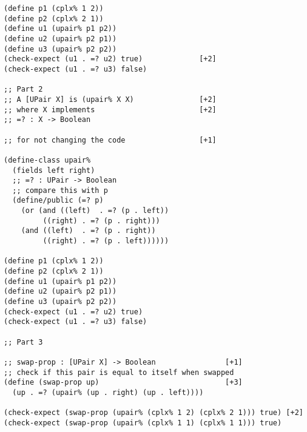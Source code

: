 \documentclass[12pt]{article}                   %
\newenvironment{solution}{}{}
\begin{document}
\begin{problem}
\begin{solution}
\begin{verbatim}
(define p1 (cplx% 1 2))
(define p2 (cplx% 2 1))
(define u1 (upair% p1 p2))
(define u2 (upair% p2 p1))
(define u3 (upair% p2 p2))
(check-expect (u1 . =? u2) true)             [+2]
(check-expect (u1 . =? u3) false)

;; Part 2
;; A [UPair X] is (upair% X X)               [+2]
;; where X implements                        [+2]
;; =? : X -> Boolean

;; for not changing the code                 [+1]

(define-class upair%
  (fields left right)
  ;; =? : UPair -> Boolean
  ;; compare this with p
  (define/public (=? p)
    (or (and ((left)  . =? (p . left))
	     ((right) . =? (p . right)))
	(and ((left)  . =? (p . right))
	     ((right) . =? (p . left))))))

(define p1 (cplx% 1 2))
(define p2 (cplx% 2 1))
(define u1 (upair% p1 p2))
(define u2 (upair% p2 p1))
(define u3 (upair% p2 p2))
(check-expect (u1 . =? u2) true)
(check-expect (u1 . =? u3) false)

;; Part 3

;; swap-prop : [UPair X] -> Boolean                [+1]
;; check if this pair is equal to itself when swapped
(define (swap-prop up)                             [+3]
  (up . =? (upair% (up . right) (up . left))))

(check-expect (swap-prop (upair% (cplx% 1 2) (cplx% 2 1))) true) [+2]
(check-expect (swap-prop (upair% (cplx% 1 1) (cplx% 1 1))) true)

\end{verbatim}
\end{solution}


\end{problem}
\end{document}
